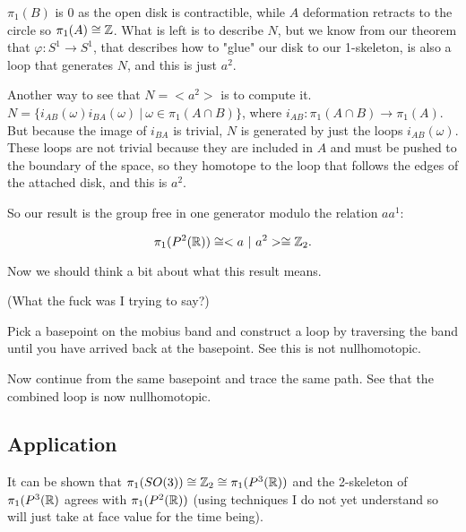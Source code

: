 \documentclass[10pt]{article}
\begin{document}
$\pi_1(B)$ is 0 as the open disk is contractible, while $A$ deformation
retracts to the circle so $\pi_1(A) \cong \mathbb{Z}$. What is left is to describe $N$,
but we know from our theorem that $\varphi: S^1 \to S^1$, that describes how to "glue" our disk to
our 1-skeleton, is also a loop that generates $N$, and this is just $a^2$.

Another way to see that $N = < a^2 >$ is to compute it. 
$N = \{ i_{AB}(\omega)i_{BA}(\omega) ~|~ \omega \in \pi_1(A \cap B) \}$, where
$i_{AB}: \pi_1(A \cap B) \to \pi_1(A)$. But because the image of $i_{BA}$ is
trivial, $N$ is generated by just the loops $i_{AB}(\omega)$. These loops are
not trivial because they are included in $A$ and must be pushed to the boundary
of the space, so they homotope to the loop that follows the edges of the
attached disk, and this is $a^2$.



So our result is the group free in one generator modulo the relation $aa^1$:

\[\pi_1(P^2(\mathbb{R})) \cong < a ~|~ a^2 > \cong \mathbb{Z}_2.\]

Now we should think a bit about what this result means.

\begin{note}

(What the fuck was I trying to say?)

Pick a basepoint on the mobius band and construct a loop by traversing the band
until you have arrived back at the basepoint. See this is not nullhomotopic.

Now continue from the same basepoint and trace the same path. See that the
combined loop is now nullhomotopic.


\end{note}

\subsection{Application}

It can be shown that $\pi_1(SO(3)) \cong \mathbb{Z}_2 \cong \pi_1(P^3(\mathbb{R}))$ and the
2-skeleton of $\pi_1(P^3(\mathbb{R})$ agrees with $\pi_1(P^2(\mathbb{R}))$ (using techniques I
do not yet understand so will just take at face value for the time being).
\end{document}
